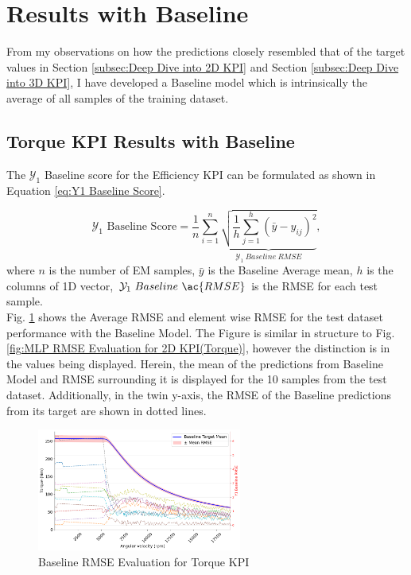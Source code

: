 \documentclass{report} %
\begin{document}
\section{Results with Baseline}\label{sec:Results with Baseline}

From my observations on how the predictions closely resembled that of the target values in Section \ref{subsec:Deep Dive into 2D KPI} and 
Section \ref{subsec:Deep Dive into 3D KPI}, I have developed a Baseline model which is intrinsically the average of all samples of the training dataset.

\subsection{Torque KPI Results with Baseline}\label{subsec:Torque KPI Results with Baseline}

The $\mathcal{Y}_1$ Baseline score for the Efficiency \ac{KPI} can be formulated as shown in Equation \ref{eq:Y1 Baseline Score}.

\begin{equation}
    \text{$\mathcal{Y}_1$ Baseline Score} = \frac{1}{n} \sum_{i=1}^{n} \underbrace{ \sqrt{\frac{1}{h} \sum_{j=1}^{h} (\bar{y} - y_{ij})^2}}_{\mathcal{Y}_1\ Baseline\ RMSE},
    \label{eq:Y1 Baseline Score}
\end{equation}
where \(n\) is the number of \ac{EM} samples, \(\bar{y}\) is the Baseline Average mean, \(h\) is the columns of 1D vector, \(\mathcal{Y}_1\ Baseline\ \ac{RMSE}\) is the \ac{RMSE} for each test sample.\\

Fig. \ref{fig:Baseline RMSE Evaluation for 2D KPI(Torque)} shows the Average \ac{RMSE} and element wise \ac{RMSE} for the test dataset performance with the 
Baseline Model. The Figure is similar in structure to Fig. \ref{fig:MLP RMSE Evaluation for 2D KPI(Torque)}, however the distinction is in the values being displayed. 
Herein, the mean of the predictions from Baseline Model and \ac{RMSE} surrounding it is displayed for the 10 samples from the test dataset. Additionally, in the twin 
y-axis, the \ac{RMSE} of the Baseline predictions from its target are shown in dotted lines.

\begin{figure}[H]
    \centering
    \includegraphics[width=0.6\textwidth]{./ReportImages/RMSE_Baseline_y1.png} 
    \caption{Baseline \ac{RMSE} Evaluation for Torque \ac{KPI}} 
    \label{fig:Baseline RMSE Evaluation for 2D KPI(Torque)}
\end{figure}
\end{document}
